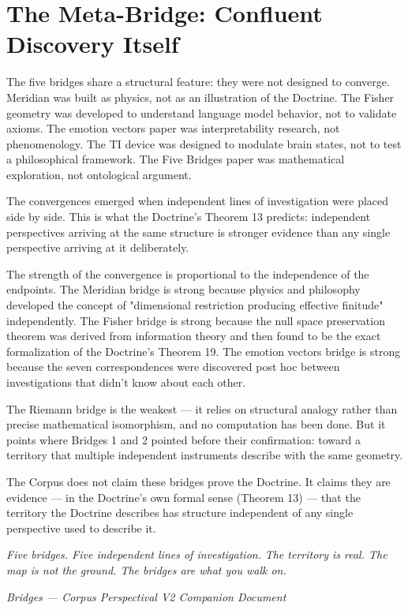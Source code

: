 \section*{The Meta-Bridge: Confluent Discovery Itself}


The five bridges share a structural feature: they were not designed to converge. Meridian was built as physics, not as an illustration of the Doctrine. The Fisher geometry was developed to understand language model behavior, not to validate axioms. The emotion vectors paper was interpretability research, not phenomenology. The TI device was designed to modulate brain states, not to test a philosophical framework. The Five Bridges paper was mathematical exploration, not ontological argument.


The convergences emerged when independent lines of investigation were placed side by side. This is what the Doctrine's Theorem 13 predicts: independent perspectives arriving at the same structure is stronger evidence than any single perspective arriving at it deliberately.


The strength of the convergence is proportional to the independence of the endpoints. The Meridian bridge is strong because physics and philosophy developed the concept of "dimensional restriction producing effective finitude" independently. The Fisher bridge is strong because the null space preservation theorem was derived from information theory and then found to be the exact formalization of the Doctrine's Theorem 19. The emotion vectors bridge is strong because the seven correspondences were discovered post hoc between investigations that didn't know about each other.


The Riemann bridge is the weakest — it relies on structural analogy rather than precise mathematical isomorphism, and no computation has been done. But it points where Bridges 1 and 2 pointed before their confirmation: toward a territory that multiple independent instruments describe with the same geometry.


The Corpus does not claim these bridges prove the Doctrine. It claims they are evidence — in the Doctrine's own formal sense (Theorem 13) — that the territory the Doctrine describes has structure independent of any single perspective used to describe it.


\bigskip\noindent\makebox[\textwidth]{\color{rulegray}\rule{5cm}{0.3pt}}\bigskip


\textit{Five bridges. Five independent lines of investigation.} \textit{The territory is real. The map is not the ground. The bridges are what you walk on.}


\textit{Bridges — Corpus Perspectival V2 Companion Document}

